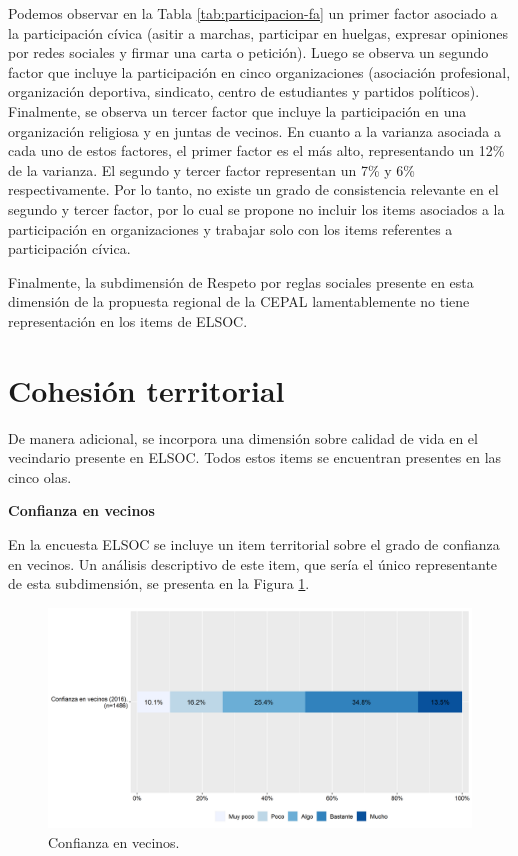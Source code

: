 \documentclass[
  12pt,
]{book}
\begin{document}
Podemos observar en la Tabla \ref{tab:participacion-fa} un primer factor asociado a la participación cívica (asitir a marchas, participar en huelgas, expresar opiniones por redes sociales y firmar una carta o petición). Luego se observa un segundo factor que incluye la participación en cinco organizaciones (asociación profesional, organización deportiva, sindicato, centro de estudiantes y partidos políticos). Finalmente, se observa un tercer factor que incluye la participación en una organización religiosa y en juntas de vecinos. En cuanto a la varianza asociada a cada uno de estos factores, el primer factor es el más alto, representando un 12\% de la varianza. El segundo y tercer factor representan un 7\% y 6\% respectivamente. Por lo tanto, no existe un grado de consistencia relevante en el segundo y tercer factor, por lo cual se propone no incluir los items asociados a la participación en organizaciones y trabajar solo con los items referentes a participación cívica.

Finalmente, la subdimensión de Respeto por reglas sociales presente en esta dimensión de la propuesta regional de la CEPAL lamentablemente no tiene representación en los items de ELSOC.

\hypertarget{cohesiuxf3n-territorial}{%
\section{Cohesión territorial}\label{cohesiuxf3n-territorial}}

De manera adicional, se incorpora una dimensión sobre calidad de vida en el vecindario presente en ELSOC. Todos estos items se encuentran presentes en las cinco olas.

\textbf{Confianza en vecinos}

En la encuesta ELSOC se incluye un item territorial sobre el grado de confianza en vecinos. Un análisis descriptivo de este item, que sería el único representante de esta subdimensión, se presenta en la Figura \ref{fig:confianza-vecinos}.

\begin{figure}[H]

{\centering \includegraphics[width=1\linewidth,height=1\textheight]{output/graphs/confianza-vecinos} 

}

\caption{Confianza en vecinos.}\label{fig:confianza-vecinos}
\end{figure}
\end{document}
